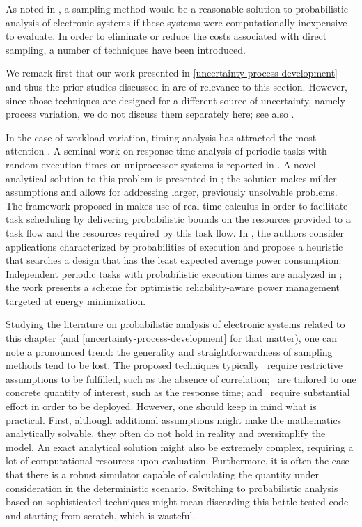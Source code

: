 As noted in , a sampling method would be a reasonable solution to
probabilistic analysis of electronic systems if these systems were
computationally inexpensive to evaluate. In order to eliminate or reduce the
costs associated with direct sampling, a number of techniques have been
introduced.

We remark first that our work presented in
\cref{uncertainty-process-development} and thus the prior studies discussed in
 are of relevance to this section. However, since those
techniques are designed for a different source of uncertainty, namely process
variation, we do not discuss them separately here; see also
.

In the case of workload variation, timing analysis has attracted the most
attention \cite{quinton2012}. A seminal work on response time analysis of
periodic tasks with random execution times on uniprocessor systems is reported
in \cite{diaz2002}. A novel analytical solution to this problem is presented in
\cite{tanasa2015}; the solution makes milder assumptions and allows for
addressing larger, previously unsolvable problems. The framework proposed in
\cite{santinelli2011} makes use of real-time calculus in order to facilitate
task scheduling by delivering probabilistic bounds on the resources provided to
a task flow and the resources required by this task flow. In
\cite{schranzhofer2009}, the authors consider applications characterized by
probabilities of execution and propose a heuristic that searches a design that
has the least expected average power consumption. Independent periodic tasks
with probabilistic execution times are analyzed in \cite{zhu2008}; the work
presents a scheme for optimistic reliability-aware power management targeted at
energy minimization.

Studying the literature on probabilistic analysis of electronic systems related
to this chapter (and \cref{uncertainty-process-development} for that matter),
one can note a pronounced trend: the generality and straightforwardness of
sampling methods tend to be lost. The proposed techniques typically \one~require
restrictive assumptions to be fulfilled, such as the absence of correlation;
\two~are tailored to one concrete quantity of interest, such as the response
time; and \three~require substantial effort in order to be deployed. However,
one should keep in mind what is practical. First, although additional
assumptions might make the mathematics analytically solvable, they often do not
hold in reality and oversimplify the model. An exact analytical solution might
also be extremely complex, requiring a lot of computational resources upon
evaluation. Furthermore, it is often the case that there is a robust simulator
capable of calculating the quantity under consideration in the deterministic
scenario. Switching to probabilistic analysis based on sophisticated techniques
might mean discarding this battle-tested code and starting from scratch, which
is wasteful.

